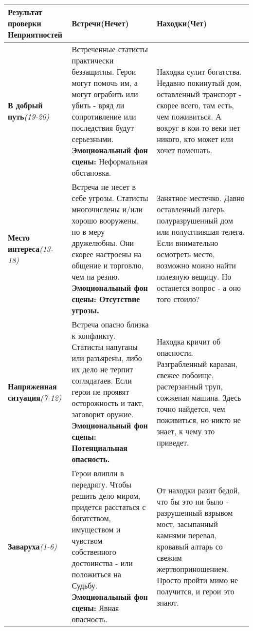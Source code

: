 \begin{center} \begin{tabular}{|p{3cm}|p{6.5cm}|p{6.5cm}|} \hline
\textbf{Результат проверки Неприятностей} & \textbf{Встречи(Нечет)} & \textbf{Находки(Чет)} \\ \hline
\textbf{В добрый путь}\newline\textit{(19-20)} & Встреченные статисты практически беззащитны. Герои могут помочь им, а могут ограбить или убить - вряд ли сопротивление или последствия будут серьезными. \newline \textbf{Эмоциональный фон сцены:} Неформальная обстановка. & Находка сулит богатства. Недавно покинутый дом, оставленный транспорт - скорее всего, там есть, чем поживиться. А вокруг в кои-то веки нет никого, кто может или хочет помешать. \\ \hline
\textbf{Место интереса}\newline\textit{(13-18)} & Встреча не несет в себе угрозы. Статисты многочислены и/или хорошо вооружены, но в меру дружелюбны. Они скорее настроены на общение и торговлю, чем на резню. \newline \textbf{Эмоциональный фон сцены: Отсутствие угрозы.} & Занятное местечко. Давно оставленный лагерь, полуразрушенный дом или полусгнившая телега. Если внимательно осмотреть место, возможно можно найти полезную вещицу. Но останется вопрос - а оно того стоило? \\ \hline
\textbf{Напряженная ситуация}\newline\textit{(7-12)} & Встреча опасно близка к конфликту. Статисты напуганы или разъярены, либо их дело не терпит соглядатаев. Если герои не проявят осторожность и такт, заговорит оружие. \newline \textbf{Эмоциональный фон сцены: Потенциальная опасность.} & Находка кричит об опасности. Разграбленный караван, свежее побоище, растерзанный труп, сожженая машина. Здесь точно найдется, чем поживиться, но никто не знает, к чему это приведет. \\ \hline
\textbf{Заваруха}\newline\textit{(1-6)} & Герои влипли в передрягу. Чтобы решить дело миром, придется расстаться с богатством, имуществом и чувством собственного достоинства - или положиться на Судьбу.
\newline \textbf{Эмоциональный фон сцены:} Явная опасность. & От находки разит бедой, что бы это ни было - разрушенный взрывом мост, засыпанный камнями перевал, кровавый алтарь со свежим жертвоприношением. Просто пройти мимо не получится, и герои это знают. \\ \hline
\end{tabular} \end{center}

